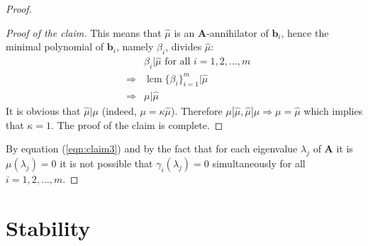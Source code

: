 \documentclass[a4paper,10pt,oneside]{book}
\begin{document}
\begin{proof}
\begin{proof}[Proof of the claim]
This means that $\hat{\mu}$ is an $\mathbf{A}$-annihilator of $\mathbf{b}_i$, hence the minimal polynomial of $\mathbf{b}_i$, namely $\beta_i$, divides $\hat{\mu}$:
\begin{eqnarray}
&& \beta_i|\hat{\mu} \text{ for all }i=1,2,\ldots,m\\
&\Rightarrow& \operatorname{lcm}\{\beta_i\}_{i=1}^m|\hat{\mu}\\
&\Rightarrow& \mu|\hat{\mu}
\end{eqnarray}
It is obvious that $\hat{\mu}|\mu$ (indeed, $\mu=\kappa\hat{\mu}$). Therefore $\mu|\hat{\mu},\hat{\mu}|\mu\Rightarrow \mu=\hat{\mu}$ which implies that $\kappa=1$. The proof of the claim is complete.
 \end{proof}
By equation (\ref{eqn:claim3}) and by the fact that for each eigenvalue $\lambda_j$ of $\mathbf{A}$ it is $\mu(\lambda_j)=0$ it is not possible that $\gamma_i(\lambda_j)=0$ simultaneously for all $i=1,2,\ldots,m$.
\end{proof}

%
%
%
%
%
%
%
\chapter{Stability}
\end{document}
